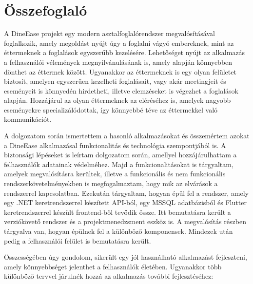 \chapter*{Összefoglaló}

A DineEase projekt egy modern asztalfoglalórendszer megvalósításával foglalkozik, amely megoldást nyújt úgy a foglalni vágyó embereknek, mint az éttermeknek a foglalások egyszerűbb kezelésére. Lehetőséget nyújt az alkalmazás a felhasználói vélemények megnyilvánulásának is, amely alapján könnyebben dönthet az éttermek között. Ugyanakkor az éttermeknek is egy olyan felületet biztosít, amelyen egyszerűen kezelheti foglalásait, vagy akár meetingjeit és eseményeit is könnyedén hirdetheti, illetve elemzéseket is végezhet a foglalások alapján. Hozzájárul az olyan éttermeknek az eléréséhez is, amelyek nagyobb eseményekre specializálódottak, így könnyebbé téve az éttermekkel való kommunikációt.

A dolgozatom során ismertettem a hasonló alkalmazásokat és összemértem azokat a DineEase alkalmazásal funkcionalitás és technológia szempontjából is. A biztonsági lépéseket is leírtam dolgozatom során, amellyel hozzájárulhattam a felhasználók adatainak védelméhez. Majd a funkcionalitásokat is tárgyaltam, amelyek megvalósításra kerültek, illetve a funkcionális és nem funkcionális rendszerkövetelményekben is megfogalmaztam, hogy mik az elvárások a rendszerrel kapcsolatban. Ezekután tárgyaltam, hogyan épül fel a rendszer, amely egy .NET keretrendszerrel készített API-ból, egy MSSQL adatbázisból és Flutter keretrendszerrel készült frontend-ből tevődik össze. Itt bemutatásra került a verziókövető rendszer és a projektmenedzsment eszköz is. A megvalósítás részben tárgyalva van, hogyan épülnek fel a különböző komponensek. Mindezek után pedig a felhasználói felület is bemutatásra került.

Összességében úgy gondolom, sikerült egy jól használható alkalmazást fejleszteni, amely könnyebbséget jelenthet a felhasználók életében. Ugyanakkor több különböző tervvel járulnék hozzá az alkalmazás további fejlesztéséhez:

